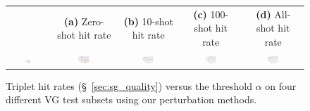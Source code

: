 \begin{figure}[htpb]
	\centering
	\small
	\setlength{\tabcolsep}{3.5pt}
	\begin{tabular}{ccccc}
 		& \textbf{(a)} Zero-shot hit rate &  \textbf{(b)} 10-shot hit rate & 
 		\textbf{(c)} 100-shot hit rate & 
 		\textbf{(d)} All-shot hit rate \vspace{-1pt} \\ 
 		{\includegraphics[align=c,width=0.13\textwidth,trim={8cm 3.5cm 1cm 3.5cm},clip]{allshot_vs_a_n3_topk3_legend.pdf}} 
 		&
        \includegraphics[align=c,width=0.2\textwidth,trim={0 0 0 0.5cm},clip]{zs_vs_a_n2_topk5.pdf} &
        \includegraphics[align=c,width=0.2\textwidth,trim={0 0 0 0.5cm},clip]{10shot_vs_a_n3_topk3.pdf} 
        &
        \includegraphics[align=c,width=0.2\textwidth,trim={0 0 0 0.5cm},clip]{100shot_vs_a_n3_topk3.pdf} 
        &
        \includegraphics[align=c,width=0.2\textwidth,trim={0 0 0 0.5cm},clip]{allshot_vs_a_n3_topk3.pdf} \\
	\end{tabular}
	\vspace{-5pt}
	\caption{\small Triplet hit rates (\S~\ref{sec:sg_quality}) versus the threshold $\alpha$ on four different VG test subsets using our perturbation methods.
	}
	\label{fig:hit_rates}
\end{figure}


